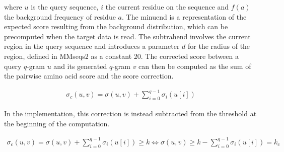 \documentclass[twoside,a4paper,bsc]{master}
\newcommand{\Qgram}[1]{\(#1\)-gram}
\begin{document}
where \(u\) is the query sequence, \(i\) the current residue on the
sequence and \(f(a)\) the background frequency of residue \(a\).
The minuend is a representation of the expected score resulting from the
background distribution, which can be precomputed when the target data is
read. The subtrahend involves the current region in the query sequence and
introduces a parameter \(d\) for the radius of the region, defined in
MMseqs2 as a constant 20.
The corrected score between a query \Qgram{q} \(u\) and its generated
\Qgram{q} \(v\) can then be computed as the sum of the pairwise amino acid
score and the score correction.

\begin{align}
\sigma_c(u,v) = \sigma (u,v) + \sum_{i=0}^{q-1} \sigma_i(u[i])
\end{align}

In the implementation, this correction is instead subtracted from the
threshold at the beginning of the computation.

\begin{align}
\sigma_c(u,v) = \sigma (u,v) + \sum_{i=0}^{q-1} \sigma_i(u[i]) \geq k
\Leftrightarrow \sigma (u,v) \geq k - \sum_{i=0}^{q-1} \sigma_i(u[i]) =
k_{c}
\end{align}
\end{document}
